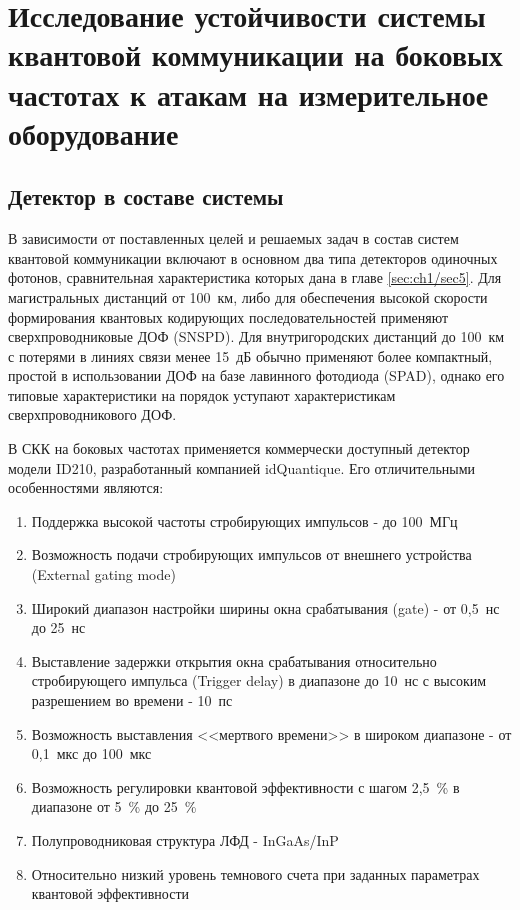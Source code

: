 \chapter{Исследование устойчивости системы квантовой коммуникации на боковых частотах к атакам на измерительное оборудование}  \label{ch:ch2}


\section{Детектор в составе системы} \label{sec:ch2/sec1}

В зависимости от поставленных целей и решаемых задач в состав систем квантовой коммуникации включают в основном два типа детекторов одиночных фотонов, сравнительная характеристика которых дана в главе \ref{sec:ch1/sec5}. Для магистральных дистанций от 100~км, либо для обеспечения высокой скорости формирования квантовых кодирующих последовательностей применяют сверхпроводниковые ДОФ (SNSPD). Для внутригородских дистанций до 100~км с потерями в линиях связи менее 15~дБ обычно применяют более компактный, простой в использовании ДОФ на базе лавинного фотодиода (SPAD), однако его типовые характеристики на порядок уступают характеристикам сверхпроводникового ДОФ. 


В СКК на боковых частотах применяется коммерчески доступный детектор модели ID210, разработанный компанией idQuantique. Его отличительными особенностями являются:
\begin{enumerate}
	\item Поддержка высокой частоты стробирующих импульсов - до 100~МГц
	\item Возможность подачи стробирующих импульсов от внешнего устройства (External gating mode)
	\item Широкий диапазон настройки ширины окна срабатывания (gate) - от 0,5~нс до 25~нс
	\item Выставление задержки открытия окна срабатывания относительно стробирующего импульса (Trigger delay) в диапазоне до 10~нс с высоким разрешением во времени - 10~пс 
	\item Возможность выставления <<мертвого времени>> в широком диапазоне - от 0,1~мкс до 100~мкс
	\item Возможность регулировки квантовой эффективности с шагом 2,5~\% в диапазоне от 5~\% до 25~\%
	\item Полупроводниковая структура ЛФД - InGaAs/InP
	\item Относительно низкий уровень темнового счета при заданных параметрах квантовой эффективности
\end{enumerate}


